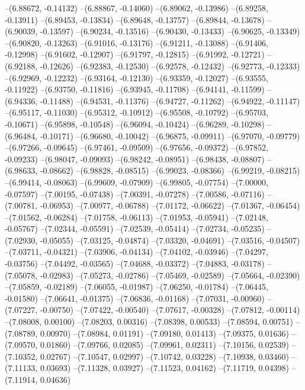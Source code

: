 --(6.88672, -0.14132)
--(6.88867, -0.14060)
--(6.89062, -0.13986)
--(6.89258, -0.13911)
--(6.89453, -0.13834)
--(6.89648, -0.13757)
--(6.89844, -0.13678)
--(6.90039, -0.13597)
--(6.90234, -0.13516)
--(6.90430, -0.13433)
--(6.90625, -0.13349)
--(6.90820, -0.13263)
--(6.91016, -0.13176)
--(6.91211, -0.13088)
--(6.91406, -0.12998)
--(6.91602, -0.12907)
--(6.91797, -0.12815)
--(6.91992, -0.12721)
--(6.92188, -0.12626)
--(6.92383, -0.12530)
--(6.92578, -0.12432)
--(6.92773, -0.12333)
--(6.92969, -0.12232)
--(6.93164, -0.12130)
--(6.93359, -0.12027)
--(6.93555, -0.11922)
--(6.93750, -0.11816)
--(6.93945, -0.11708)
--(6.94141, -0.11599)
--(6.94336, -0.11488)
--(6.94531, -0.11376)
--(6.94727, -0.11262)
--(6.94922, -0.11147)
--(6.95117, -0.11030)
--(6.95312, -0.10912)
--(6.95508, -0.10792)
--(6.95703, -0.10671)
--(6.95898, -0.10548)
--(6.96094, -0.10424)
--(6.96289, -0.10298)
--(6.96484, -0.10171)
--(6.96680, -0.10042)
--(6.96875, -0.09911)
--(6.97070, -0.09779)
--(6.97266, -0.09645)
--(6.97461, -0.09509)
--(6.97656, -0.09372)
--(6.97852, -0.09233)
--(6.98047, -0.09093)
--(6.98242, -0.08951)
--(6.98438, -0.08807)
--(6.98633, -0.08662)
--(6.98828, -0.08515)
--(6.99023, -0.08366)
--(6.99219, -0.08215)
--(6.99414, -0.08063)
--(6.99609, -0.07909)
--(6.99805, -0.07754)
--(7.00000, -0.07597)
--(7.00195, -0.07438)
--(7.00391, -0.07278)
--(7.00586, -0.07116)
--(7.00781, -0.06953)
--(7.00977, -0.06788)
--(7.01172, -0.06622)
--(7.01367, -0.06454)
--(7.01562, -0.06284)
--(7.01758, -0.06113)
--(7.01953, -0.05941)
--(7.02148, -0.05767)
--(7.02344, -0.05591)
--(7.02539, -0.05414)
--(7.02734, -0.05235)
--(7.02930, -0.05055)
--(7.03125, -0.04874)
--(7.03320, -0.04691)
--(7.03516, -0.04507)
--(7.03711, -0.04321)
--(7.03906, -0.04134)
--(7.04102, -0.03946)
--(7.04297, -0.03756)
--(7.04492, -0.03565)
--(7.04688, -0.03372)
--(7.04883, -0.03178)
--(7.05078, -0.02983)
--(7.05273, -0.02786)
--(7.05469, -0.02589)
--(7.05664, -0.02390)
--(7.05859, -0.02189)
--(7.06055, -0.01987)
--(7.06250, -0.01784)
--(7.06445, -0.01580)
--(7.06641, -0.01375)
--(7.06836, -0.01168)
--(7.07031, -0.00960)
--(7.07227, -0.00750)
--(7.07422, -0.00540)
--(7.07617, -0.00328)
--(7.07812, -0.00114)
--(7.08008, 0.00100)
--(7.08203, 0.00316)
--(7.08398, 0.00533)
--(7.08594, 0.00751)
--(7.08789, 0.00970)
--(7.08984, 0.01191)
--(7.09180, 0.01413)
--(7.09375, 0.01636)
--(7.09570, 0.01860)
--(7.09766, 0.02085)
--(7.09961, 0.02311)
--(7.10156, 0.02539)
--(7.10352, 0.02767)
--(7.10547, 0.02997)
--(7.10742, 0.03228)
--(7.10938, 0.03460)
--(7.11133, 0.03693)
--(7.11328, 0.03927)
--(7.11523, 0.04162)
--(7.11719, 0.04398)
--(7.11914, 0.04636)
